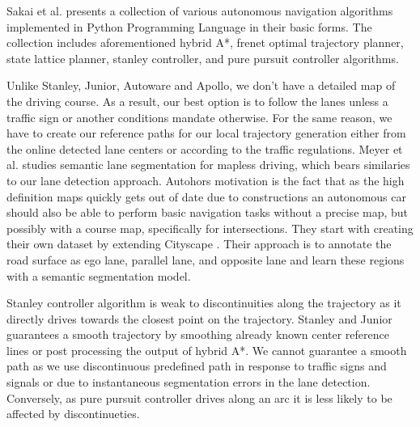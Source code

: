 Sakai et al. \cite{cite18} presents a collection of various autonomous
navigation algorithms implemented in Python Programming Language in their basic
forms. The collection includes aforementioned hybrid A*, frenet optimal
trajectory planner, state lattice planner, stanley controller, and pure pursuit
controller algorithms.

Unlike Stanley, Junior, Autoware and Apollo, we don't have a detailed map of
the driving course. As a result, our best option is to follow the lanes unless
a traffic sign or another conditions mandate otherwise. For the same reason, we
have to create our reference paths for our local trajectory generation either
from the online detected lane centers or according to the traffic regulations.
Meyer et al. \cite{cite9} studies semantic lane segmentation for mapless
driving, which bears similaries to our lane detection approach.  Autohors
motivation is the fact that as the high definition maps quickly gets out of
date due to constructions an autonomous car should also be able to perform
basic navigation tasks without a precise map, but possibly with a course map,
specifically for intersections. They start with creating their own dataset by
extending Cityscape \cite{Cordts2016TheCD}. Their approach is to annotate the
road surface as ego lane, parallel lane, and opposite lane and learn these
regions with a semantic segmentation model.

Stanley controller algorithm is weak to discontinuities along the trajectory as
it directly drives towards the closest point on the trajectory. Stanley and
Junior guarantees a smooth trajectory by smoothing already known center
reference lines or post processing the output of hybrid A*. We cannot guarantee
a smooth path as we use discontinuous predefined path in response to traffic
signs and signals or due to instantaneous segmentation errors in the lane
detection.  Conversely, as pure pursuit controller drives along an arc it is
less likely to be affected by discontinueties.
